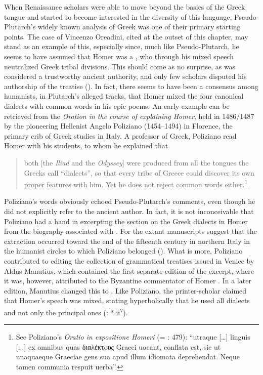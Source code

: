 When Renaissance scholars were able to move beyond the basics of the Greek tongue and started to become interested in the diversity of this language, Pseudo-Plutarch’s widely known analysis of  Greek was one of their primary starting points. The case of Vincenzo Oreadini, cited at the outset of this chapter, may stand as an example of this, especially since, much like Pseudo-Plutarch, he seems to have assumed that Homer was a , who through his mixed speech neutralized Greek tribal divisions. This should come as no surprise, as  was considered a trustworthy ancient authority, and only few scholars disputed his authorship of the treatise (\citealt{VanRooy2018c}). In fact, there seems to have been a consensus among humanists, in Plutarch’s alleged tracks, that Homer mixed the four canonical dialects with common words in his epic poems. An early example can be retrieved from the \textit{Oration in the course of explaining Homer}, held in 1486/1487 by the pioneering Hellenist Angelo Poliziano (1454–1494) in Florence, the primary crib of Greek studies in Italy. A professor of Greek, Poliziano read Homer with his students, to whom he explained that

\begin{quote}
both [the \textit{Iliad} and the \textit{Odyssey}] were produced from all the tongues the Greeks call “dialects”, so that every tribe of Greece could discover its own proper features with him. Yet he does not reject common words either.\footnote{See Poliziano’s \textit{Oratio in expositione Homeri} (= \citealt{Poliziano1553}: 479): “utraque […] linguis [...] ex omnibus quas διαλέκτoυς Graeci uocant, conflata est, sic ut unaquaeque Graeciae gens sua apud illum idiomata deprehendat. Neque tamen communia respuit uerba”.}
\end{quote}

Poliziano’s words obviously echoed Pseudo-Plutarch’s comments, even though he did not explicitly refer to the ancient author. In fact, it is not inconceivable that Poliziano had a hand in excerpting the section on the Greek dialects in Homer from the biography associated with . For the extant manuscripts suggest that the extraction occurred toward the end of the fifteenth century in northern Italy in the humanist circles to which Poliziano belonged (\citealt{VanRooy2018c}). What is more, Poliziano contributed to editing the collection of grammatical treatises issued in Venice by Aldus Manutius, which contained the first separate edition of the excerpt, where it was, however, attributed to the Byzantine commentator of Homer . In a later edition, Manutius changed this to . Like Poliziano, the  printer-scholar claimed that Homer’s speech was mixed, stating hyperbolically that he used all dialects and not only the principal ones (\citealt{Manutius1496Aldus}: *.ii\textsc{\textsuperscript{v}}).

